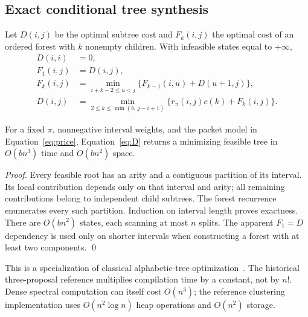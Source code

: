 \subsection{Exact conditional tree synthesis}\label{sec:exact}
Let $D(i,j)$ be the optimal subtree cost and $F_k(i,j)$ the optimal cost of an
ordered forest with $k$ nonempty children. With infeasible states equal to
$+\infty$,
\begin{align}
D(i,i)&=0,\label{eq:Dbase}\\
F_1(i,j)&=D(i,j),\label{eq:F1}\\
F_k(i,j)&=\min_{i+k-2\le u<j}\bigl\{F_{k-1}(i,u)+D(u+1,j)\bigr\},\label{eq:Forest}\\
D(i,j)&=\min_{2\le k\le\min(b,\,j-i+1)}\bigl\{r_\pi(i,j)c(k)+F_k(i,j)\bigr\}.\label{eq:D}
\end{align}
\begin{theorem}\label{thm:exact}
For a fixed $\pi$, nonnegative interval weights, and the packet model in
Equation~\eqref{eq:price}, Equation~\eqref{eq:D} returns a minimizing feasible
tree in $O(bn^3)$ time and $O(bn^2)$ space.
\end{theorem}
\begin{proof}
Every feasible root has an arity and a contiguous partition of its interval. Its
local contribution depends only on that interval and arity; all remaining
contributions belong to independent child subtrees. The forest recurrence
enumerates every such partition. Induction on interval length proves exactness.
There are $O(bn^2)$ states, each scanning at most $n$ splits. The apparent
$F_1=D$ dependency is used only on shorter intervals when constructing a forest
with at least two components. \qed
\end{proof}
This is a specialization of classical alphabetic-tree
optimization~\cite{alphabetic}. The historical three-proposal reference
multiplies compilation time by a constant, not by $n!$. Dense spectral
computation can itself cost $O(n^3)$; the reference clustering implementation
uses $O(n^2\log n)$ heap operations and $O(n^2)$ storage.

